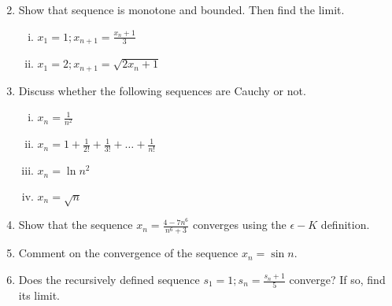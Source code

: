 \documentclass[journal,12pt,onecolumn]{IEEEtran}
\begin{document}
\begin{enumerate}
\begin{multicols}{3}
\begin{enumerate}[(i)]
\end{enumerate}
\end{multicols}
\item Show that sequence is monotone and bounded.  Then find the limit.
\begin{multicols}{2}
\begin{enumerate}[(i)]
\item 
$
x_1 = 1;  x_{n+1} = \frac{x_n+1}{3}
$
\item$
x_1 = 2;  x_{n+1} = \sqrt{2x_n+1}
$
\end{enumerate}
\end{multicols}
\item Discuss whether the following sequences are Cauchy or not.	
\begin{multicols}{2}
\begin{enumerate}[(i)]
\setlength\itemsep{2em}
\item 
$
x_n = \frac{1}{n^2}
$
\item
$
x_n = 1 + \frac{1}{2!} + \frac{1}{3!} + \dots + \frac{1}{n!}
$
\item
$
x_n = \ln n^2 
$
\item
$
x_n = \sqrt{n}
$
\end{enumerate}
\end{multicols}
\item Show that  the sequence $x_n = \frac{4-7n^6}{n^6+3}$ converges using the $\epsilon-K$ definition.
\item Comment on the convergence of the sequence $x_n = \sin n$.
\item Does the recursively defined sequence $s_1 = 1; s_n = \frac{s_n+1}{5}$  converge?  If so, find its limit.
\end{enumerate}
\end{document}
